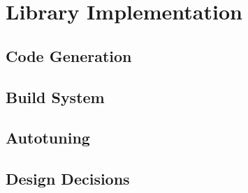 \section{Library Implementation}
  \subsection{Code Generation}
  \subsection{Build System}
  \subsection{Autotuning}
  \subsection{Design Decisions}
